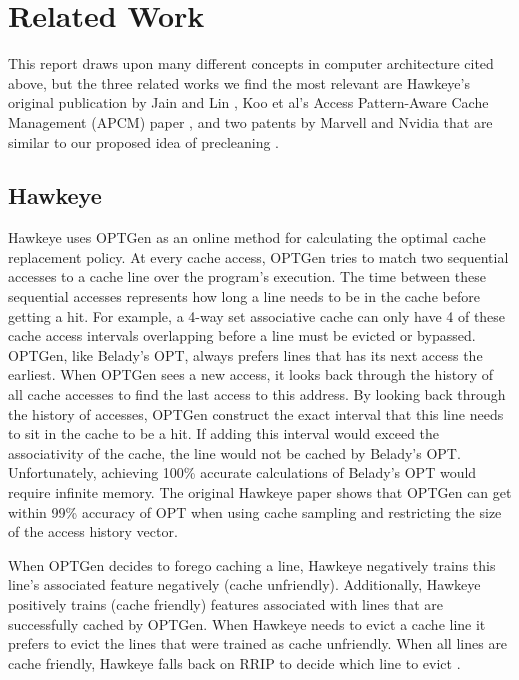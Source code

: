 \chapter{Related Work}

This report draws upon many different concepts in computer architecture cited above, but the three related works we find the most relevant are Hawkeye’s original publication by Jain and Lin \cite{hawkeye}, Koo et al’s Access Pattern-Aware Cache Management (APCM) paper \cite{apcm}, and two patents by Marvell and Nvidia that are similar to our proposed idea of precleaning \cite{preclean_cpu,preclean_nvidia_patent}.

\section{Hawkeye}
Hawkeye uses OPTGen as an online method for calculating the optimal cache replacement policy. At every cache access, OPTGen tries to match two sequential accesses to a cache line over the program's execution. The time between these sequential accesses represents how long a line needs to be in the cache before getting a hit. For example, a 4-way set associative cache can only have 4 of these cache access intervals overlapping before a line must be evicted or bypassed. OPTGen, like Belady’s OPT, always prefers lines that has its next access the earliest. When OPTGen sees a new access, it looks back through the history of all cache accesses to find the last access to this address. By looking back through the history of accesses, OPTGen construct the exact interval that this line needs to sit in the cache to be a hit. If adding this interval would exceed the associativity of the cache, the line would not be cached by Belady's OPT. Unfortunately, achieving 100\% accurate calculations of Belady's OPT would require infinite memory. The original Hawkeye paper shows that OPTGen can get within 99\% accuracy of OPT when using cache sampling and restricting the size of the access history vector.

When OPTGen decides to forego caching a line, Hawkeye negatively trains this line’s associated feature negatively (cache unfriendly). Additionally, Hawkeye positively trains (cache friendly) features associated with lines that are successfully cached by OPTGen. When Hawkeye needs to evict a cache line it prefers to evict the lines that were trained as cache unfriendly. When all lines are cache friendly, Hawkeye falls back on RRIP to decide which line to evict \cite{rrip}. 

